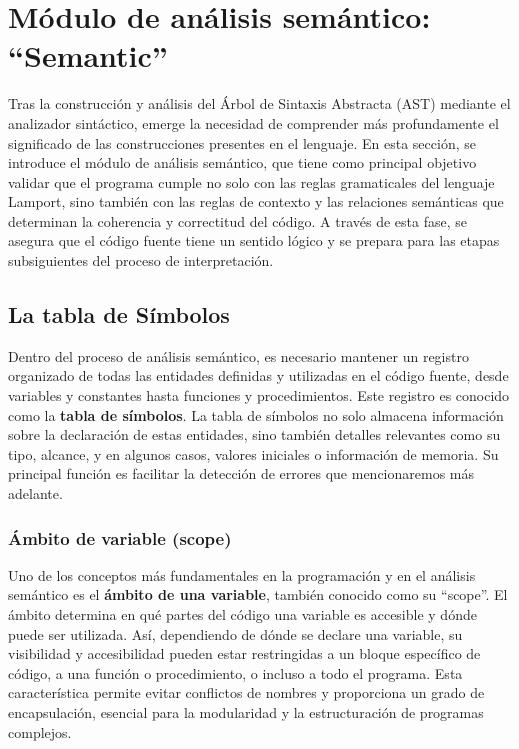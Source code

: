 \newpage

\section{Módulo de análisis semántico: ``Semantic''}\label{sec:implementacionSemantic}
Tras la construcción y análisis del Árbol de Sintaxis Abstracta (AST) mediante el analizador sintáctico, emerge la necesidad de comprender más profundamente el significado de las construcciones presentes en el lenguaje. En esta sección, se introduce el módulo de análisis semántico, que tiene como principal objetivo validar que el programa cumple no solo con las reglas gramaticales del lenguaje Lamport, sino también con las reglas de contexto y las relaciones semánticas que determinan la coherencia y correctitud del código. A través de esta fase, se asegura que el código fuente tiene un sentido lógico y se prepara para las etapas subsiguientes del proceso de interpretación.

\subsection{La tabla de Símbolos}
Dentro del proceso de análisis semántico, es necesario mantener un registro organizado de todas las entidades definidas y utilizadas en el código fuente, desde variables y constantes hasta funciones y procedimientos. Este registro es conocido como la \textbf{tabla de símbolos}. La tabla de símbolos no solo almacena información sobre la declaración de estas entidades, sino también detalles relevantes como su tipo, alcance, y en algunos casos, valores iniciales o información de memoria. Su principal función es facilitar la detección de errores que mencionaremos más adelante.

\subsubsection{Ámbito de variable (scope)}
Uno de los conceptos más fundamentales en la programación y en el análisis semántico es el \textbf{ámbito de una variable}, también conocido como su ``scope''. El ámbito determina en qué partes del código una variable es accesible y dónde puede ser utilizada. Así, dependiendo de dónde se declare una variable, su visibilidad y accesibilidad pueden estar restringidas a un bloque específico de código, a una función o procedimiento, o incluso a todo el programa. Esta característica permite evitar conflictos de nombres y proporciona un grado de encapsulación, esencial para la modularidad y la estructuración de programas complejos.

